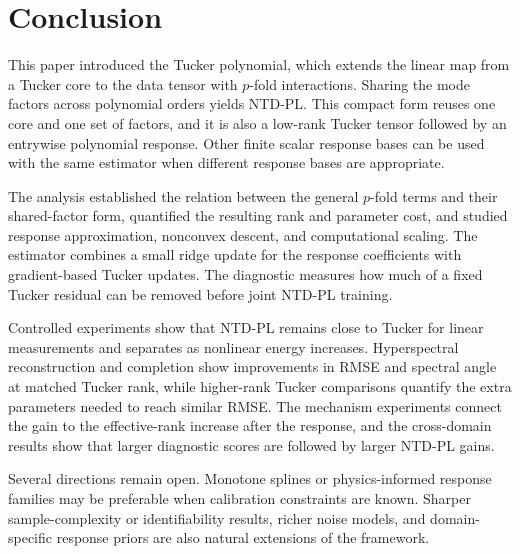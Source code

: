 \section{Conclusion}
\label{sec:conclusion}
\enlargethispage{2pt}

This paper introduced the Tucker polynomial, which extends the linear map from
a Tucker core to the data tensor with $p$-fold interactions. Sharing the mode
factors across polynomial orders yields NTD-PL. This compact form reuses one
core and one set of factors, and it is also a low-rank Tucker tensor followed by
an entrywise polynomial response. Other finite scalar response bases can be used
with the same estimator when different response bases are appropriate.

The analysis established the relation between the general $p$-fold terms and
their shared-factor form, quantified the resulting rank and parameter cost, and
studied response approximation, nonconvex descent, and computational scaling.
The estimator combines a small ridge update for the response coefficients with
gradient-based Tucker updates. The diagnostic measures how much of a fixed
Tucker residual can be removed before joint NTD-PL training.

Controlled experiments show that NTD-PL remains close to Tucker for linear
measurements and separates as nonlinear energy increases. Hyperspectral
reconstruction and completion show improvements in RMSE and spectral angle at
matched Tucker rank, while higher-rank Tucker comparisons quantify the extra
parameters needed to reach similar RMSE. The mechanism experiments connect the
gain to the effective-rank increase after the response, and the cross-domain
results show that larger diagnostic scores are followed by larger NTD-PL gains.

Several directions remain open. Monotone splines or physics-informed response
families may be preferable when calibration constraints are known. Sharper
sample-complexity or identifiability results, richer noise models, and
domain-specific response priors are also natural extensions of the framework.
